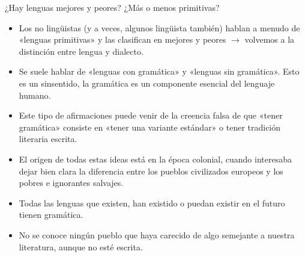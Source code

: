 \documentclass[handout]{beamer}
\begin{document}
\begin{frame}{}
\begin{center}
\LARGE ¿Hay lenguas mejores y peores? ¿Más o menos primitivas? 
\end{center}
\end{frame}

\begin{frame}{}
\begin{itemize}
	\item Los no lingüistas (y a veces, algunos lingüista también) hablan a menudo de «lenguas primitivas» y las clasifican en mejores y peores $\rightarrow$ volvemos a la distinción entre lengua y dialecto.
	\item Se suele hablar de «lenguas con gramática» y «lenguas sin gramática». Esto es un sinsentido, la gramática es un componente esencial del lenguaje humano.
	\item Este tipo de afirmaciones puede venir de la creencia falsa de que «tener gramática» consiste en «tener una variante estándar» o tener tradición literaria escrita.
	\item El origen de todas estas ideas está en la época colonial, cuando interesaba dejar bien clara la diferencia entre los pueblos civilizados europeos y los pobres e ignorantes salvajes.
	\item Todas las lenguas que existen, han existido o puedan existir en el futuro tienen gramática.
	\item No se conoce ningún pueblo que haya carecido de algo semejante a nuestra literatura, aunque no esté escrita. 
\end{itemize}
\end{frame}
\end{document}
